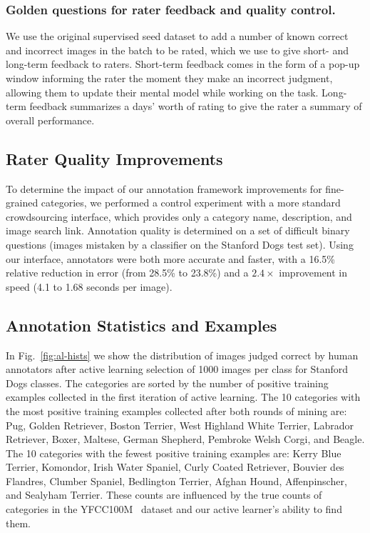 \documentclass[runningheads]{llncs}
\begin{document}
\subsubsection{Golden questions for rater feedback and quality control.}
We use the original supervised seed dataset to add a number of known correct and incorrect images in the batch to be rated, which we use to give short- and long-term feedback to raters.
Short-term feedback comes in the form of a pop-up window informing the rater the moment they make an incorrect judgment, allowing them to update their mental model while working on the task.
Long-term feedback summarizes a days' worth of rating to give the rater a summary of overall performance.


\subsection{Rater Quality Improvements}
\label{app_sec:raters}

To determine the impact of our annotation framework improvements for fine-grained categories, we performed a control experiment with a more standard crowdsourcing interface, which provides only a category name, description, and image search link.
Annotation quality is determined on a set of difficult binary questions (images mistaken by a classifier on the Stanford Dogs test set).
Using our interface, annotators were both more accurate and faster, with a 16.5\% relative reduction in error (from 28.5\% to 23.8\%) and a $2.4\times$ improvement in speed (4.1 to 1.68 seconds per image).


\subsection{Annotation Statistics and Examples}
In Fig.~\ref{fig:al-hists} we show the distribution of images judged correct by human annotators after active learning selection of 1000 images per class for Stanford Dogs classes.  The categories are sorted by the number of positive training examples collected in the first iteration of active learning.  The 10 categories with the most positive training examples collected after both rounds of mining are: Pug, Golden Retriever, Boston Terrier, West Highland White Terrier, Labrador Retriever, Boxer, Maltese, German Shepherd, Pembroke Welsh Corgi, and Beagle.  The 10 categories with the fewest positive training examples are: Kerry Blue Terrier, Komondor, Irish Water Spaniel, Curly Coated Retriever, Bouvier des Flandres, Clumber Spaniel, Bedlington Terrier, Afghan Hound, Affenpinscher, and Sealyham Terrier.
These counts are influenced by the true counts of categories in the YFCC100M~\cite{thomee2015yfcc100m} dataset and our active learner's ability to find them.
\end{document}
